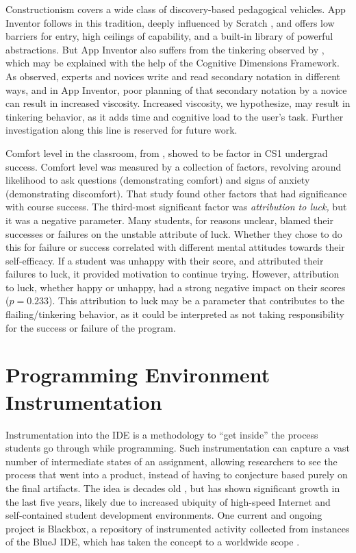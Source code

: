 Constructionism \citep{papert1991situating} covers a wide class of discovery-based pedagogical vehicles. App Inventor follows in this tradition, deeply influenced by Scratch \citep{resnick2009scratch}, and offers low barriers for entry, high ceilings of capability, and a built-in library of powerful abstractions. But App Inventor also suffers from the tinkering observed by \citet{perkins-1986}, which may be explained with the help of the Cognitive Dimensions Framework. As \citet{petre-2006} observed, experts and novices write and read secondary notation in different ways, and in App Inventor, poor planning of that secondary notation by a novice can result in increased viscosity. Increased viscosity, we hypothesize, may result in tinkering behavior, as it adds time and cognitive load to the user's task. Further investigation along this line is reserved for future work.

Comfort level in the classroom, from \citet{wilson-2002}, showed to be factor in CS1 undergrad success. Comfort level was measured by a collection of factors, revolving around likelihood to ask questions (demonstrating comfort) and signs of anxiety (demonstrating discomfort). That study found other factors that had significance with course success. The third-most significant factor was \emph{attribution to luck,} but it was a negative parameter. Many students, for reasons unclear, blamed their successes or failures on the unstable attribute of luck. Whether they chose to do this for failure or success correlated with different mental attitudes towards their self-efficacy. If a student was unhappy with their score, and attributed their failures to luck, it provided motivation to continue trying. However, attribution to luck, whether happy or unhappy, had a strong negative impact on their scores ($p=0.233$). This attribution to luck may be a parameter that contributes to the flailing/tinkering behavior, as it could be interpreted as not taking responsibility for the success or failure of the program. 


\section{Programming Environment Instrumentation}
Instrumentation into the IDE is a methodology to ``get inside'' the process students go through while programming. Such instrumentation can capture a vast number of intermediate states of an assignment, allowing researchers to see the process that went into a product, instead of having to conjecture based purely on the final artifacts. The idea is decades old \citep{spohrer1985goal}, but has shown significant growth in the last five years, likely due to increased ubiquity of high-speed Internet and self-contained student development environments. One current and ongoing project is Blackbox, a repository of instrumented activity collected from instances of the BlueJ IDE, which has taken the concept to a worldwide scope \citep{brown2014blackbox}. 

